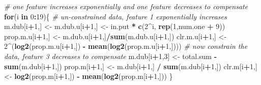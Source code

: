 \documentclass[onecolumn]{article}
\newenvironment{Shaded}{\begin{snugshade}}{\end{snugshade}}
\newcommand{\CommentTok}[1]{\textcolor[rgb]{0.56,0.35,0.01}{\textit{#1}}}
\newcommand{\ControlFlowTok}[1]{\textcolor[rgb]{0.13,0.29,0.53}{\textbf{#1}}}
\newcommand{\DecValTok}[1]{\textcolor[rgb]{0.00,0.00,0.81}{#1}}
\newcommand{\KeywordTok}[1]{\textcolor[rgb]{0.13,0.29,0.53}{\textbf{#1}}}
\newcommand{\NormalTok}[1]{#1}
\newcommand{\OperatorTok}[1]{\textcolor[rgb]{0.81,0.36,0.00}{\textbf{#1}}}
\newcommand{\StringTok}[1]{\textcolor[rgb]{0.31,0.60,0.02}{#1}}
\begin{document}
\begin{Shaded}
\begin{Highlighting}[]
\CommentTok{# one feature increases exponentially and one feature decreases to compensate}
\ControlFlowTok{for}\NormalTok{(i }\ControlFlowTok{in} \DecValTok{0}\OperatorTok{:}\DecValTok{19}\NormalTok{)\{}
    \CommentTok{# un-constrained data, feature 1 exponentially increases}
\NormalTok{    m.dub[i}\OperatorTok{+}\DecValTok{1}\NormalTok{,] <-}\StringTok{ }\NormalTok{m.dub.u[i}\OperatorTok{+}\DecValTok{1}\NormalTok{,] <-}\StringTok{ }\NormalTok{in.put }\OperatorTok{*}\StringTok{ }\KeywordTok{c}\NormalTok{(}\DecValTok{2}\OperatorTok{^}\NormalTok{i, }\KeywordTok{rep}\NormalTok{(}\DecValTok{1}\NormalTok{,num.one }\OperatorTok{+}\StringTok{ }\DecValTok{9}\NormalTok{))}
\NormalTok{    prop.m.u[i}\OperatorTok{+}\DecValTok{1}\NormalTok{,] <-}\StringTok{ }\NormalTok{m.dub.u[i}\OperatorTok{+}\DecValTok{1}\NormalTok{,]}\OperatorTok{/}\KeywordTok{sum}\NormalTok{(m.dub.u[i}\OperatorTok{+}\DecValTok{1}\NormalTok{,])}
\NormalTok{    clr.m.u[i}\OperatorTok{+}\DecValTok{1}\NormalTok{,] <-}\StringTok{ }\DecValTok{2}\OperatorTok{^}\NormalTok{(}\KeywordTok{log2}\NormalTok{(prop.m.u[i}\OperatorTok{+}\DecValTok{1}\NormalTok{,]) }\OperatorTok{-}\StringTok{ }\KeywordTok{mean}\NormalTok{(}\KeywordTok{log2}\NormalTok{(prop.m.u[i}\OperatorTok{+}\DecValTok{1}\NormalTok{,])))}
    \CommentTok{# now constrain the data, feature 3 decreases to compensate}
\NormalTok{    m.dub[i}\OperatorTok{+}\DecValTok{1}\NormalTok{,}\DecValTok{3}\NormalTok{] <-}\StringTok{ }\NormalTok{total.sum }\OperatorTok{-}\StringTok{ }\KeywordTok{sum}\NormalTok{(m.dub[i}\OperatorTok{+}\DecValTok{1}\NormalTok{,])}
\NormalTok{    prop.m[i}\OperatorTok{+}\DecValTok{1}\NormalTok{,] <-}\StringTok{ }\NormalTok{m.dub[i}\OperatorTok{+}\DecValTok{1}\NormalTok{,] }\OperatorTok{/}\StringTok{ }\KeywordTok{sum}\NormalTok{(m.dub[i}\OperatorTok{+}\DecValTok{1}\NormalTok{,])}
\NormalTok{    clr.m[i}\OperatorTok{+}\DecValTok{1}\NormalTok{,] <-}\StringTok{ }\KeywordTok{log2}\NormalTok{(prop.m[i}\OperatorTok{+}\DecValTok{1}\NormalTok{,]) }\OperatorTok{-}\StringTok{ }\KeywordTok{mean}\NormalTok{(}\KeywordTok{log2}\NormalTok{(prop.m[i}\OperatorTok{+}\DecValTok{1}\NormalTok{,]))}
\NormalTok{\}}
\end{Highlighting}
\end{Shaded}
\end{document}
